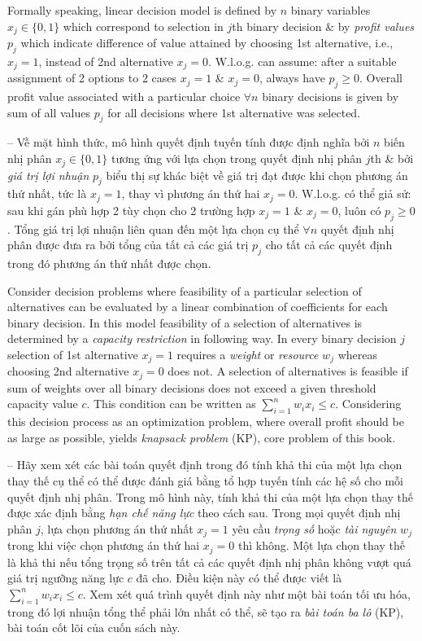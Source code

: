 \documentclass{article}
\begin{document}
\begin{itemize}
\begin{itemize}
        Formally speaking, linear decision model is defined by $n$ binary variables $x_j\in\{0,1\}$ which correspond to selection in $j$th binary decision \& by {\it profit values} $p_j$ which indicate difference of value attained by choosing 1st alternative, i.e., $x_j = 1$, instead of 2nd alternative $x_j = 0$. W.l.o.g. can assume: after a suitable assignment of 2 options to 2 cases $x_j = 1$ \& $x_j = 0$, always have $p_j\ge0$. Overall profit value associated with a particular  choice $\forall n$ binary decisions is given by sum of all values $p_j$ for all decisions where 1st alternative was selected.
        
        -- Về mặt hình thức, mô hình quyết định tuyến tính được định nghĩa bởi $n$ biến nhị phân $x_j\in\{0,1\}$ tương ứng với lựa chọn trong quyết định nhị phân $j$th \& bởi {\it giá trị lợi nhuận} $p_j$ biểu thị sự khác biệt về giá trị đạt được khi chọn phương án thứ nhất, tức là $x_j = 1$, thay vì phương án thứ hai $x_j = 0$. W.l.o.g. có thể giả sử: sau khi gán phù hợp 2 tùy chọn cho 2 trường hợp $x_j = 1$ \& $x_j = 0$, luôn có $p_j\ge0$. Tổng giá trị lợi nhuận liên quan đến một lựa chọn cụ thể $\forall n$ quyết định nhị phân được đưa ra bởi tổng của tất cả các giá trị $p_j$ cho tất cả các quyết định trong đó phương án thứ nhất được chọn.
        
        Consider decision problems where feasibility of a particular selection of alternatives can be evaluated by a linear combination of coefficients for each binary decision. In this model feasibility of a selection of alternatives is determined by a {\it capacity restriction} in following way. In every binary decision $j$ selection of 1st alternative $x_j = 1$ requires a {\it weight} or {\it resource} $w_j$ whereas choosing 2nd alternative $x_j = 0$ does not. A selection of alternatives is feasible if sum of weights over all binary decisions does not exceed a given threshold capacity value $c$. This condition can be written as $\sum_{i=1}^n w_ix_i\le c$. Considering this decision process as an optimization problem, where overall profit should be as large as possible, yields {\it knapsack problem} (KP), core problem of this book.
        
        -- Hãy xem xét các bài toán quyết định trong đó tính khả thi của một lựa chọn thay thế cụ thể có thể được đánh giá bằng tổ hợp tuyến tính các hệ số cho mỗi quyết định nhị phân. Trong mô hình này, tính khả thi của một lựa chọn thay thế được xác định bằng {\it hạn chế năng lực} theo cách sau. Trong mọi quyết định nhị phân $j$, lựa chọn phương án thứ nhất $x_j = 1$ yêu cầu {\it trọng số} hoặc {\it tài nguyên} $w_j$ trong khi việc chọn phương án thứ hai $x_j = 0$ thì không. Một lựa chọn thay thế là khả thi nếu tổng trọng số trên tất cả các quyết định nhị phân không vượt quá giá trị ngưỡng năng lực $c$ đã cho. Điều kiện này có thể được viết là $\sum_{i=1}^n w_ix_i\le c$. Xem xét quá trình quyết định này như một bài toán tối ưu hóa, trong đó lợi nhuận tổng thể phải lớn nhất có thể, sẽ tạo ra {\it bài toán ba lô} (KP), bài toán cốt lõi của cuốn sách này.
        

\end{itemize}
\end{itemize}
\end{document}
